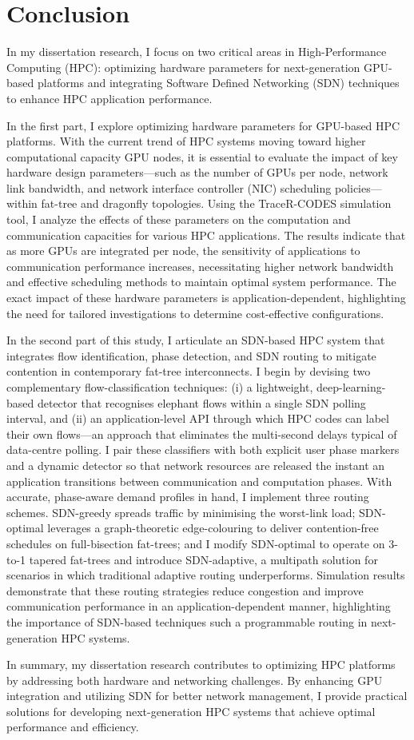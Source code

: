 \chapter{Conclusion}
In my dissertation research, I focus on two critical areas in High-Performance Computing (HPC): optimizing hardware parameters for next-generation GPU-based platforms and integrating Software Defined Networking (SDN) techniques to enhance HPC application performance.

In the first part, I explore optimizing hardware parameters for GPU-based HPC platforms. With the current trend of HPC systems moving toward higher computational capacity GPU nodes, it is essential to evaluate the impact of key hardware design parameters—such as the number of GPUs per node, network link bandwidth, and network interface controller (NIC) scheduling policies—within fat-tree and dragonfly topologies. Using the TraceR-CODES simulation tool, I analyze the effects of these parameters on the computation and communication capacities for various HPC applications. The results indicate that as more GPUs are integrated per node, the sensitivity of applications to communication performance increases, necessitating higher network bandwidth and effective scheduling methods to maintain optimal system performance. The exact impact of these hardware parameters is application-dependent, highlighting the need for tailored investigations to determine cost-effective configurations.

In the second part of this study, I articulate an SDN-based HPC system that integrates flow identification, phase detection, and SDN routing to mitigate contention in contemporary fat-tree interconnects. I begin by devising two complementary flow-classification techniques: (i) a lightweight, deep-learning-based detector that recognises elephant flows within a single SDN polling interval, and (ii) an application-level API through which HPC codes can label their own flows—an approach that eliminates the multi-second delays typical of data-centre polling. I pair these classifiers with both explicit user phase markers and a dynamic detector so that network resources are released the instant an application transitions between communication and computation phases. With accurate, phase-aware demand profiles in hand, I implement three routing schemes. SDN-greedy spreads traffic by minimising the worst-link load; SDN-optimal leverages a graph-theoretic edge-colouring to deliver contention-free schedules on full-bisection fat-trees; and I modify SDN-optimal to operate on 3-to-1 tapered fat-trees and introduce SDN-adaptive, a multipath solution for scenarios in which traditional adaptive routing underperforms. Simulation results demonstrate that these routing strategies reduce congestion and improve communication performance in an application-dependent manner, highlighting the importance of SDN-based techniques such a  programmable routing in next-generation HPC systems.

In summary, my dissertation research contributes to optimizing HPC platforms by addressing both hardware and networking challenges. By enhancing GPU integration and utilizing SDN for better network management, I provide practical solutions for developing next-generation HPC systems that achieve optimal performance and efficiency.
